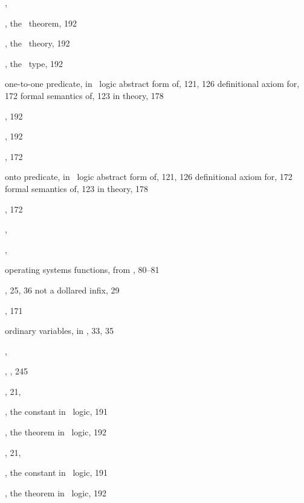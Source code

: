 \begin{theindex}
  \item {}, 
  \item {}, the \HOL\ theorem, 192
  \item {}, the \HOL\ theory, 192
  \item {}, the \HOL\ type, 192
  \item one-to-one predicate, in \HOL\ logic
    \subitem abstract form of, 121, 126
    \subitem definitional axiom for, 172
    \subitem formal semantics of, 123
    \subitem in  theory, 178
  \item {}, 192
  \item {}, 192
  \item {}, 172
  \item onto predicate, in \HOL\ logic
    \subitem abstract form of, 121, 126
    \subitem definitional axiom for, 172
    \subitem formal semantics of, 123
    \subitem in  theory, 178
  \item {}, 172
  \item {}, 
  \item {}, 
  \item operating systems functions, from \HOL, 80--81
  \item {}, 25, 36
    \subitem not a dollared infix, 29
  \item {}, 171
  \item ordinary variables, in \ML, 33, 35
  \item {}, 
  \item {}, , 245
  \item {}, 21, 
  \item {}, the constant in \HOL\ logic, 191
  \item {}, the theorem in \HOL\ logic, 192
  \item {}, 21, 
  \item {}, the constant in \HOL\ logic, 191
  \item {}, the theorem in \HOL\ logic, 192

  \indexspace


\end{theindex}
